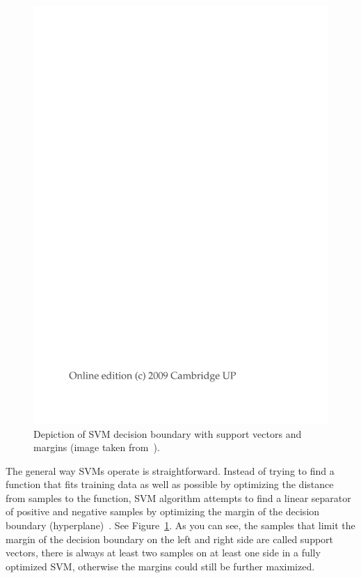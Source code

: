 \begin{figure}[htbp]
    \centering
        \includegraphics[page=3,trim=5.5cm 16cm 4cm 6.5cm,clip,width=\textwidth]{./images/external/intro-ir-svm.pdf}
    \caption{Depiction of SVM decision boundary with support vectors and margins (image taken from~\cite{manning2008introduction}).}
    \label{fig:background.svm.decision.intro}
\end{figure}

The general way SVMs operate is straightforward. Instead of trying to find a function that fits training data as well as possible by optimizing the distance from samples to the function, SVM algorithm attempts to find a linear separator of positive and negative samples by optimizing the margin of the decision boundary (hyperplane)~\cite{manning2008introduction}. See Figure~\ref{fig:background.svm.decision.intro}. As you can see, the samples that limit the margin of the decision boundary on the left and right side are called support vectors, there is always at least two samples on at least one side in a fully optimized SVM, otherwise the margins could still be further maximized.

